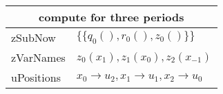 \documentclass[12pt]{article}
\begin{document}
\newcommand{\zTrip}[1]{\{q_#1(),r_#1(),z_#1()\}}

\begin{tabular}{|l|p{4in}|}
\hline
\multicolumn{2}{|c|}{compute for three periods}\\
\hline
zSubNow& $\{\zTrip{0} \}$\\
\hline
zVarNames&$z_0(x_{1}),z_1(x_{0}),z_2(x_{-1})$\\
\hline
uPositions&$x_0\rightarrow u_{2},x_1\rightarrow u_{1},x_2\rightarrow u_{0}$\\
\hline
\end{tabular}
\end{document}
